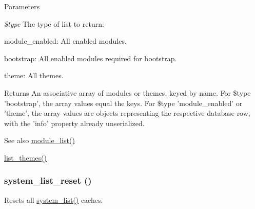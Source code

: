 \begin{DoxyParams}{Parameters}
\item[{\em \$type}]The type of list to return:
\begin{DoxyItemize}
\item module\_\-enabled: All enabled modules.
\item bootstrap: All enabled modules required for bootstrap.
\item theme: All themes.
\end{DoxyItemize}\end{DoxyParams}
\begin{DoxyReturn}{Returns}
An associative array of modules or themes, keyed by name. For \$type 'bootstrap', the array values equal the keys. For \$type 'module\_\-enabled' or 'theme', the array values are objects representing the respective database row, with the 'info' property already unserialized.
\end{DoxyReturn}
\begin{DoxySeeAlso}{See also}
\hyperlink{module_8inc_ad4ef444bbb8e56724e12908cf9b6e1aa}{module\_\-list()} 

\hyperlink{includes_2theme_8inc_a48d5521b10139d745626435d804353a4}{list\_\-themes()} 
\end{DoxySeeAlso}
\hypertarget{module_8inc_ac141d5e0a5817eda15b376a5737dec3d}{
\subsubsection[{system\_\-list\_\-reset}]{\setlength{\rightskip}{0pt plus 5cm}system\_\-list\_\-reset ()}}
\label{module_8inc_ac141d5e0a5817eda15b376a5737dec3d}
Resets all \hyperlink{module_8inc_a807821e98f8d626a7043923080ba6438}{system\_\-list()} caches. 